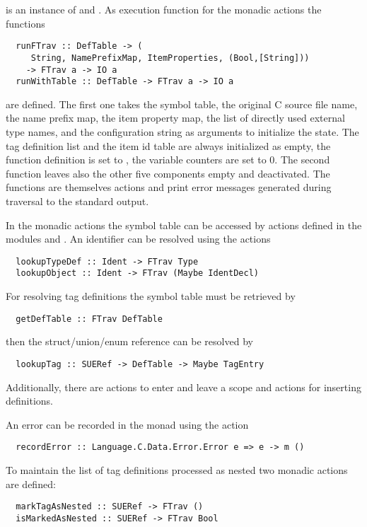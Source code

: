  is an
instance of  and . As execution function for the monadic actions the functions
\begin{verbatim}
  runFTrav :: DefTable -> (
     String, NamePrefixMap, ItemProperties, (Bool,[String]))
    -> FTrav a -> IO a
  runWithTable :: DefTable -> FTrav a -> IO a
\end{verbatim}
are defined. The first one takes the symbol table, the original C source file name, the name prefix map, 
the item property map, the list of directly used external type names, and the configuration string as
arguments to initialize the state. The tag definition list and the item id table are always initialized as empty,
the function definition is set to , the variable counters are set to 0. The second
function leaves also the other five components empty and deactivated. The functions are themselves
 actions and print error messages generated during traversal to the standard output.

In the monadic actions the symbol table can be accessed by actions defined in the modules 
 and . An identifier can be
resolved using the actions
\begin{verbatim}
  lookupTypeDef :: Ident -> FTrav Type
  lookupObject :: Ident -> FTrav (Maybe IdentDecl)
\end{verbatim}
For resolving tag definitions the symbol table must be retrieved by
\begin{verbatim}
  getDefTable :: FTrav DefTable
\end{verbatim}
then the struct/union/enum reference can be resolved by
\begin{verbatim}
  lookupTag :: SUERef -> DefTable -> Maybe TagEntry
\end{verbatim}
Additionally, there are actions to enter and leave a scope and actions for inserting definitions.

An error can be recorded in the monad using the action
\begin{verbatim}
  recordError :: Language.C.Data.Error.Error e => e -> m () 
\end{verbatim}

To maintain the list of tag definitions processed as nested two monadic actions are defined:
\begin{verbatim}
  markTagAsNested :: SUERef -> FTrav ()
  isMarkedAsNested :: SUERef -> FTrav Bool
\end{verbatim}

